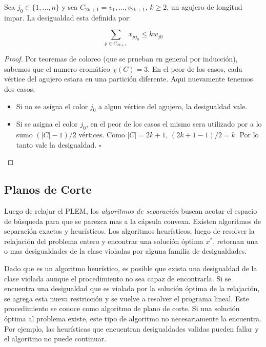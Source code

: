 Sea $j_0 \in \{1,...,n\}$ y sea $C_{2k+1} = v_1,...,v_{2k+1}$, $k \geq 2$, un agujero de longitud impar. La desigualdad esta definida por:

\begin{equation}
\sum_{p \in C_{2k+1}} x_{pj_0} \leq k w_{j0}
\end{equation}

\begin{proof}
Por teoremas de coloreo (que se prueban en general por inducción), sabemos que el numero cromático $\chi(C) = 3$. En el peor de los casos, cada vértice del agujero estara en una partición diferente. Aqui nuevamente tenemos dos casos:

\begin{itemize}
\item Si no se asigna el color $j_0$ a algun vértice del agujero, la desigualdad vale.
\item Si se asigna el color $j_0$, en el peor de los casos el mismo sera utilizado por a lo sumo $(|C|-1)/2$ vértices. Como $|C| = 2k+1$,  $(2k+1-1)/2 = k$. Por lo tanto vale la desigualdad.  \hfill $\square$
\end{itemize}

\end{proof}

\subsection{Planos de Corte}

Luego de relajar el PLEM, los \textit{algoritmos de separación} buscan acotar el espacio de búsqueda para que se parezca mas a la cápsula convexa. Existen algoritmos de separación exactos y heurísticos. Los algoritmos heurísticos, luego de resolver la relajación del problema entero y encontrar una solución óptima $x^*$, retornan una o mas desigualdades de la clase violadas por alguna familia de desigualdades.

Dado que es un algoritmo heurístico, es posible que exista una desigualdad de la clase violada aunque el procedimiento no sea capaz de encontrarla. Si se encuentra una desigualdad que es violada por la solución óptima de la relajación, se agrega esta nueva restricción y se vuelve a resolver el programa lineal. Este procedimiento se conoce como algoritmo de plano de corte. Si una solución óptima al problema existe, este tipo de algoritmo no necesariamente la encuentra. Por ejemplo, las heurísticas que encuentran desigualdades validas pueden fallar y el algoritmo no puede continuar.

